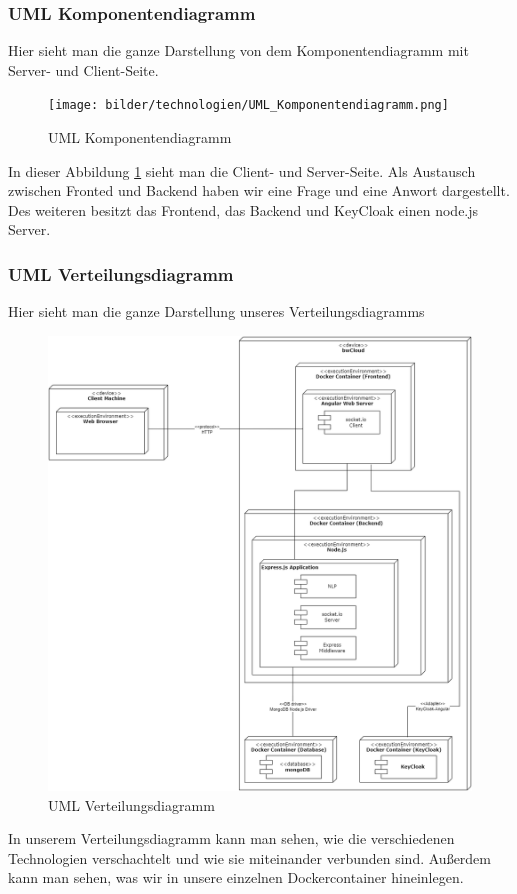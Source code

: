 \newpage

\subsubsection{UML Komponentendiagramm}
Hier sieht man die ganze Darstellung von dem Komponentendiagramm mit Server- und Client-Seite.
\begin{figure}[H]
    \centering
    \texttt{[image: bilder/technologien/UML\_Komponentendiagramm.png]}
    \caption{UML Komponentendiagramm}
    \label{fig:UML_Komponentendiagramm}
    \end{figure}
\noindent In dieser Abbildung \ref{fig:UML_Komponentendiagramm} sieht man die Client- und Server-Seite. 
Als Austausch zwischen Fronted und Backend haben wir eine Frage und eine Anwort dargestellt.
Des weiteren besitzt das Frontend, das Backend und KeyCloak einen node.js Server.

\newpage

\subsubsection{UML Verteilungsdiagramm}
Hier sieht man die ganze Darstellung unseres Verteilungsdiagramms
\begin{figure}[H]
\centering
\includegraphics[width=1.0\textwidth]{bilder/technologien/UML_Verteilunsgdiagramm.png}
\caption{UML Verteilungsdiagramm}
\label{fig:UML_Verteilungsdiagramm}
\end{figure}
\noindent In unserem Verteilungsdiagramm kann man sehen, 
wie die verschiedenen Technologien verschachtelt und wie sie miteinander verbunden sind.
Außerdem kann man sehen, was wir in unsere einzelnen Dockercontainer hineinlegen.